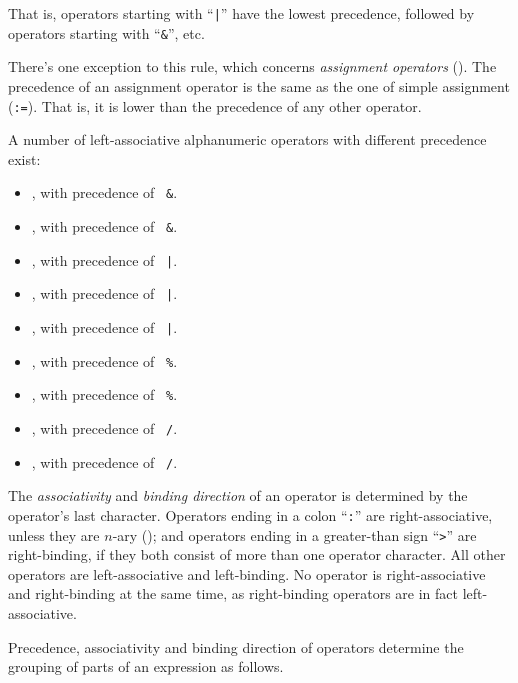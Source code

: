 That is, operators starting with ``\lstinline!|!'' have the lowest precedence, followed by operators starting with ``\lstinline!&!'', etc. 

There's one exception to this rule, which concerns {\em assignment operators} (). The precedence of an assignment operator is the same as the one of simple assignment (\lstinline!:=!). That is, it is lower than the precedence of any other operator. 

A number of left-associative alphanumeric operators with different precedence exist:
\begin{itemize}
  \item {}, with precedence of ~\lstinline!&!. 
  \item {}, with precedence of ~\lstinline!&!. 
  \item {}, with precedence of ~\lstinline!|!.  
  \item {}, with precedence of ~\lstinline!|!.  
  \item {}, with precedence of ~\lstinline!|!.  
  \item {}, with precedence of ~\lstinline!%!. 
  \item {}, with precedence of ~\lstinline!%!. 
  \item {}, with precedence of ~\lstinline!/!. 
  \item {}, with precedence of ~\lstinline!/!.   
\end{itemize}

The {\em associativity} and {\em binding direction} of an operator is determined by the operator's last character. Operators ending in a colon ``\lstinline!:!'' are right-associative, unless they are $n$-ary (); and operators ending in a greater-than sign ``\lstinline!>!'' are right-binding, if they both consist of more than one operator character. All other operators are left-associative and left-binding. No operator is right-associative and right-binding at the same time, as right-binding operators are in fact left-associative. 

Precedence, associativity and binding direction of operators determine the grouping of parts of an expression as follows.


